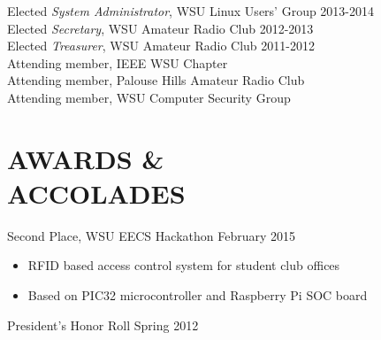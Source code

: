 \documentclass[line, margin]{res}
\begin{document}
\begin{resume}
            Elected {\it System Administrator}, WSU Linux Users' Group \hfill 2013-2014\\
            Elected {\it Secretary}, WSU Amateur Radio Club \hfill 2012-2013\\
            Elected {\it Treasurer}, WSU Amateur Radio Club \hfill 2011-2012\\
            Attending member, IEEE WSU Chapter\\
            Attending member, Palouse Hills Amateur Radio Club\\
            Attending member, WSU Computer Security Group

\section{AWARDS \& \\ ACCOLADES}
            Second Place, WSU EECS Hackathon \hfill February 2015
        \begin{itemize} \itemsep -2pt
                \item RFID based access control system for student club offices
                \item Based on PIC32 microcontroller and Raspberry Pi SOC board
            \end{itemize}
            President's Honor Roll \hfill Spring 2012

\end{resume}
\end{document}
